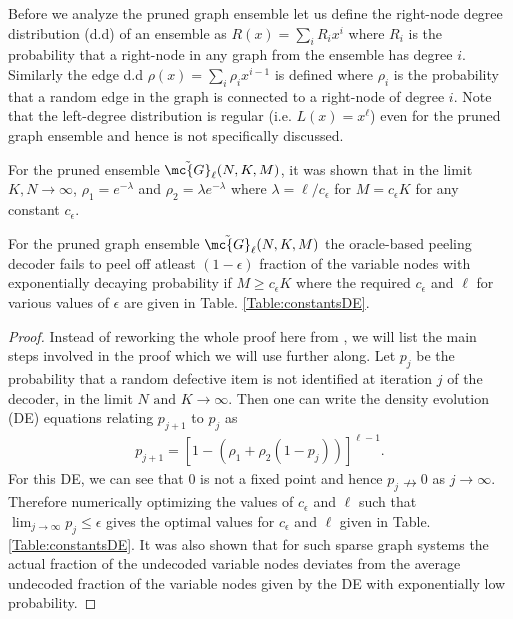 \documentclass[conference,twocolumn]{IEEEtran}
\def\ceps{c_{\epsilon}}
\begin{document}
Before we analyze the pruned graph ensemble let us define the right-node degree distribution (d.d) of an ensemble as $R(x)=\sum_{i}R_i x^i$ where $R_i$ is the probability that a right-node in any graph from the ensemble has degree $i$. Similarly the edge d.d $\rho(x)=\sum_{i}\rho_ix^{i-1}$ is defined where $\rho_i$ is the probability that a random edge in the graph is connected to a right-node of degree $i$. Note that the left-degree distribution is regular (i.e. $L(x)=x^\ell$) even for the pruned graph ensemble and hence is not specifically discussed.

\begin{lemma}
\label{Lem:EdgeddSAFFRON}
For the pruned ensemble $\tilde{\mc{G}}_{\ell}(N,K,M)$, it was shown that in the limit $K,N\rightarrow\infty$, $\rho_{1}=e^{-\lambda}$ and $\rho_{2}=\lambda e^{-\lambda}$ where $\lambda=\ell/\ceps$ for $M=\ceps K$ for any constant $\ceps$. 
\end{lemma}

\begin{lemma}
\label{Lem:PeelingAnalysisLeftRegular}
For the pruned graph ensemble $\tilde{\mc{G}}_{\ell}(N, K,M)$ the oracle-based peeling decoder fails to peel off atleast $(1-\epsilon)$ fraction of the variable nodes with exponentially decaying probability if $M\geq \ceps K$ where the required $\ceps$ and $\ell$ for various values of $\epsilon$ are given in Table. \ref{Table:constantsDE}.
\end{lemma}
\begin{proof}
Instead of reworking the whole proof here from \cite{lee2015saffron}, we will list the main steps involved in the proof which we will use further along. Let $p_j$ be the probability that a random defective item is not identified at iteration $j$ of the decoder, in the limit $N \text{ and } K\rightarrow \infty$. Then one can write the density evolution (DE) equations relating $p_{j+1}$ to $p_{j}$ as 
\begin{align*}
p_{j+1}=\left[1-(\rho_1+\rho_2(1-p_j))\right]^{\ell-1}.
\end{align*}
For this DE, we can see that $0$ is not a fixed point and hence $p_j\nrightarrow 0$ as $j\rightarrow\infty$. Therefore numerically optimizing the values of $\ceps$ and $\ell$ such that $\lim_{j\rightarrow\infty}p_j\leq \epsilon$ gives the optimal values for $\ceps$ and $\ell$ given in Table. \ref{Table:constantsDE}. It was also shown \cite{lee2015saffron,richardson2008modern} that for such sparse graph systems the actual fraction of the undecoded variable nodes deviates from the average undecoded fraction of the variable nodes given by the DE with exponentially low probability. 
\end{proof}
\end{document}
